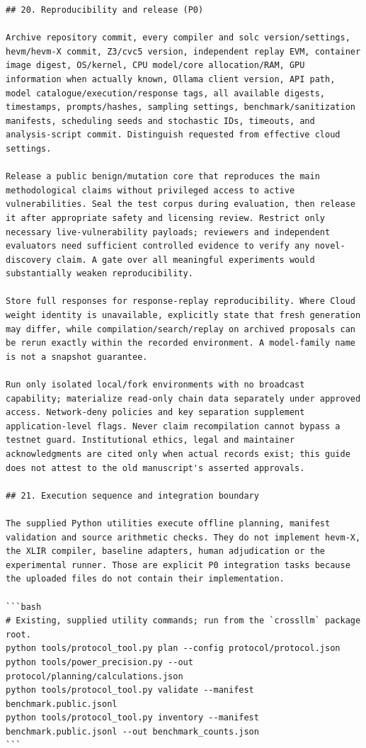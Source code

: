 \documentclass[11pt,a4paper]{article}
\begin{document}
\begin{verbatim}
## 20. Reproducibility and release (P0)

Archive repository commit, every compiler and solc version/settings, hevm/hevm-X commit, Z3/cvc5 version, independent replay EVM, container image digest, OS/kernel, CPU model/core allocation/RAM, GPU information when actually known, Ollama client version, API path, model catalogue/execution/response tags, all available digests, timestamps, prompts/hashes, sampling settings, benchmark/sanitization manifests, scheduling seeds and stochastic IDs, timeouts, and analysis-script commit. Distinguish requested from effective cloud settings.

Release a public benign/mutation core that reproduces the main methodological claims without privileged access to active vulnerabilities. Seal the test corpus during evaluation, then release it after appropriate safety and licensing review. Restrict only necessary live-vulnerability payloads; reviewers and independent evaluators need sufficient controlled evidence to verify any novel-discovery claim. A gate over all meaningful experiments would substantially weaken reproducibility.

Store full responses for response-replay reproducibility. Where Cloud weight identity is unavailable, explicitly state that fresh generation may differ, while compilation/search/replay on archived proposals can be rerun exactly within the recorded environment. A model-family name is not a snapshot guarantee.

Run only isolated local/fork environments with no broadcast capability; materialize read-only chain data separately under approved access. Network-deny policies and key separation supplement application-level flags. Never claim recompilation cannot bypass a testnet guard. Institutional ethics, legal and maintainer acknowledgments are cited only when actual records exist; this guide does not attest to the old manuscript's asserted approvals.

## 21. Execution sequence and integration boundary

The supplied Python utilities execute offline planning, manifest validation and source arithmetic checks. They do not implement hevm-X, the XLIR compiler, baseline adapters, human adjudication or the experimental runner. Those are explicit P0 integration tasks because the uploaded files do not contain their implementation.

```bash
# Existing, supplied utility commands; run from the `crossllm` package root.
python tools/protocol_tool.py plan --config protocol/protocol.json
python tools/power_precision.py --out protocol/planning/calculations.json
python tools/protocol_tool.py validate --manifest benchmark.public.jsonl
python tools/protocol_tool.py inventory --manifest benchmark.public.jsonl --out benchmark_counts.json
```


\end{verbatim}
\end{document}
